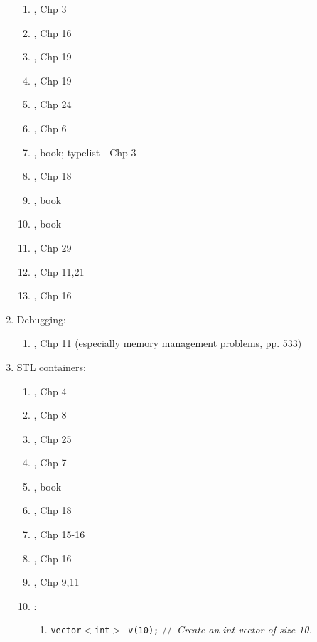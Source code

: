 \begin{enumerate}
\begin{enumerate}
	\item \cite{Eckel2003}, Chp 3
	\item \cite{Eckel2000}, Chp 16
	\item \cite{Stroustrup2014}, Chp 19
	\item \cite{Stroustrup2009}, Chp 19
	\item \cite{Oualline2003}, Chp 24
	\item \cite{Vermeir2001}, Chp 6
	\item \cite{Alexandrescu2001}, book; typelist - Chp 3
	\item \cite{Schildt2003}, Chp 18
	\item \cite{Vandevoorde2003}, book
	\item \cite{Abrahams2005}, book
	\item \cite{Allain2012}, Chp 29
	\item \cite{Gregoire2014}, Chp 11,21
	\item \cite{Lippman2013}, Chp 16
	\end{enumerate}
\item Debugging: \vspace{-0.3cm}
	\begin{enumerate} \itemsep -2pt
	\item \cite{Eckel2003}, Chp 11 (especially memory management problems, pp. 533)
	\end{enumerate}
\item STL containers: \vspace{-0.3cm}
	\begin{enumerate} \itemsep -2pt
	\item \cite{Eckel2003}, Chp 4
	\item \cite{Schildt2004a}, Chp 8
	\item \cite{Oualline2003}, Chp 25
	\item \cite{Vermeir2001}, Chp 7
	\item \cite{Reese2006a}, book
	\item \cite{Allain2012}, Chp 18
	\item \cite{Gregoire2014}, Chp 15-16
	\item \cite{Prata2012}, Chp 16
	\item \cite{Lippman2013}, Chp 9,11
	\item \cite{EliteHussar2010}: \vspace{-0.2cm}
		\begin{enumerate} \itemsep -2pt
		\item {\tt vector$<$int$>$ v(10);} \hspace{0.2in} //{\it\ Create an int vector of size 10.}

\end{enumerate}
\end{enumerate}
\end{enumerate}
